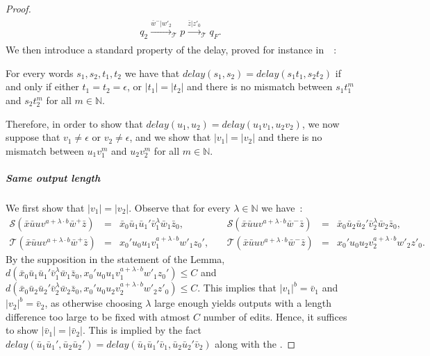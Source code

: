 \documentclass[a4paper,UKenglish,cleveref, autoref, thm-restate,authorcolumns, colorlinks]{lipics-v2021}
\newcommand\delay{\mathit{delay}}
\newcommand{\trans}{\mathcal{T}}
\newcommand{\transs}{\mathcal{S}}
\begin{document}
\begin{proof}
\begin{gather*}
\begin{array}{lllllllllllll}
    q_2 \xrightarrow{\bar{w}^-|w'_2}_\trans
    p \xrightarrow{\bar{z}|z'_0}_\trans
    q_F.    
    \end{array}
\end{gather*}
We then introduce a standard property of the delay,
proved for instance in~\cite{DBLP:journals/ijfcs/FiliotMR20}~:
\begin{claim}\label{claim:TP}
    For every words $s_1,s_2,t_1,t_2$ we have that $\delay(s_1,s_2) = \delay(s_1t_1,s_2t_2)$
    if and only if either $t_1 = t_2 = \epsilon$,
    or $|t_1| = |t_2|$ and there is no mismatch
    between $s_1t_1^{m}$ and $s_2t_2^{m}$ for all $m \in \mathbb{N}$.
\end{claim}
Therefore, in order to show that $\delay(u_1,u_2) = \delay(u_1v_1,u_2v_2)$,
we now suppose that $v_1 \neq \epsilon$ or $v_2 \neq \epsilon$,
and we show that $|v_1| = |v_2|$ and there is no mismatch between  $u_1v_1^{m}$ and $u_2v_2^{m}$
for all $m \in \mathbb{N}$.

\subparagraph*{Same output length}
We first show that $|v_1| = |v_2|$.
Observe that for every $\lambda \in \mathbb{N}$ we have~: 
\[
\begin{array}{lllllll}
\transs(\bar{x}\bar{u}uv^{a + \lambda \cdot b}\bar{w}^+\bar{z})
& = & \bar{x}_0\bar{u}_1\bar{u}_1'\bar{v}_1^{\lambda}\bar{w}_1\bar{z}_0,
& \ &
\transs(\bar{x}\bar{u}uv^{a + \lambda \cdot b}\bar{w}^-\bar{z})
& = & \bar{x}_0\bar{u}_2\bar{u}_2'\bar{v}_2^{\lambda}\bar{w}_2\bar{z}_0,\\
\trans(\bar{x}\bar{u}uv^{a + \lambda \cdot b}\bar{w}^+\bar{z})
& = & x_0'u_0u_1v_1^{a + \lambda \cdot b}w'_1z_0',
& \ &
\trans(\bar{x}\bar{u}uv^{a + \lambda \cdot b}\bar{w}^-\bar{z})
& = & x_0'u_0u_2v_2^{a + \lambda \cdot b}w'_2z'_0.
\end{array}
\]
By the supposition in the statement of the Lemma,
$d(\bar{x}_0\bar{u}_1\bar{u}_1'\bar{v}_1^{\lambda}\bar{w}_1\bar{z}_0,
x_0'u_0u_1v_1^{a + \lambda \cdot b}w'_1z_0') \leq C$
and
$d(\bar{x}_0\bar{u}_2\bar{u}_2'\bar{v}_2^{\lambda}\bar{w}_2\bar{z}_0,
x_0'u_0u_2v_2^{a + \lambda \cdot b}w'_2z'_0) \leq C$.
This implies that $|v_1|^b = \bar{v}_1$ and  $|v_2|^b = \bar{v}_2$,
as otherwise choosing $\lambda$ large enough yields outputs
with a length difference too large  to be fixed with atmost $C$ number of edits. Hence, it suffices to show $|\bar{v}_1| = |\bar{v}_2|$. This is implied by the fact $\delay(\bar{u}_1\bar{u}_1',\bar{u}_2\bar{u}_2') = \delay(\bar{u}_1\bar{u}_1'\bar{v}_1,\bar{u}_2\bar{u}_2'\bar{v}_2)$ along with the 
.


\end{proof}
\end{document}
